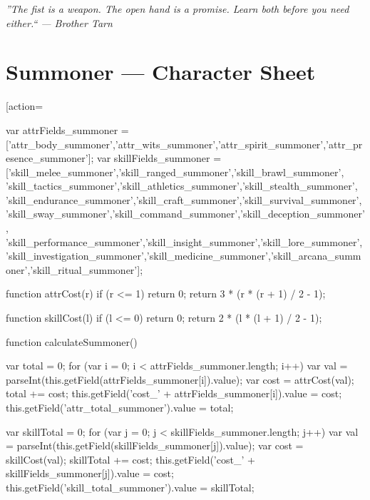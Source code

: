 \documentclass[10pt]{article}
\begin{document}
\vspace{0.5em}
\begin{center}
    {\small\sffamily\itshape ''The fist is a weapon. The open hand is a promise. Learn both before you need either.`` --- Brother Tarn}
\end{center}

\newpage%
\section*{Summoner --- Character Sheet}

\begin{Form}[action={%
    var attrFields_summoner = ['attr_body_summoner','attr_wits_summoner','attr_spirit_summoner','attr_presence_summoner'];
    var skillFields_summoner = ['skill_melee_summoner','skill_ranged_summoner','skill_brawl_summoner',
        'skill_tactics_summoner','skill_athletics_summoner','skill_stealth_summoner',
        'skill_endurance_summoner','skill_craft_summoner','skill_survival_summoner',
        'skill_sway_summoner','skill_command_summoner','skill_deception_summoner',
        'skill_performance_summoner','skill_insight_summoner','skill_lore_summoner',
        'skill_investigation_summoner','skill_medicine_summoner','skill_arcana_summoner','skill_ritual_summoner'];
    
    function attrCost(r) {
        if (r <= 1) return 0;
        return 3 * (r * (r + 1) / 2 - 1);
    }
    
    function skillCost(l) {
        if (l <= 0) return 0;
        return 2 * (l * (l + 1) / 2 - 1);
    }
    
    function calculateSummoner() {
        var total = 0;
        for (var i = 0; i < attrFields_summoner.length; i++) {
            var val = parseInt(this.getField(attrFields_summoner[i]).value);
            var cost = attrCost(val);
            total += cost;
            this.getField('cost_' + attrFields_summoner[i]).value = cost;
        }
        this.getField('attr_total_summoner').value = total;
        
        var skillTotal = 0;
        for (var j = 0; j < skillFields_summoner.length; j++) {
            var val = parseInt(this.getField(skillFields_summoner[j]).value);
            var cost = skillCost(val);
            skillTotal += cost;
            this.getField('cost_' + skillFields_summoner[j]).value = cost;
        }
        this.getField('skill_total_summoner').value = skillTotal;
    }
    
}
\end{Form}
\end{document}
